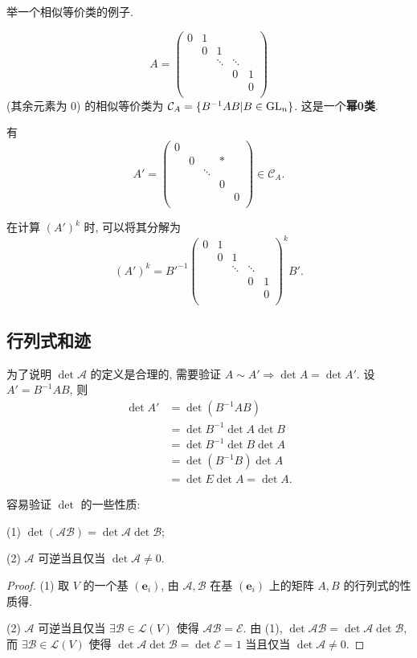 \documentclass{ctexart}
\begin{document}
举一个相似等价类的例子.
\begin{example}
    \[A=\begin{pmatrix}
        0 & 1 \\
        & 0 & 1 \\
        && \ddots & \ddots \\
        &&& 0 & 1 \\
        &&&& 0 \\
    \end{pmatrix}\]
    (其余元素为 $0$) 的相似等价类为 $\mathcal{C}_A=\{B^{-1}AB|B\in\operatorname{GL} _n\}$. 这是一个\textbf{幂0类}.

    有
    \[A'=\begin{pmatrix}
        0 \\
        & 0 && * \\
        && \ddots \\
        &&& 0 \\
        &&&& 0 \\
    \end{pmatrix}\in\mathcal{C}_A.\]

    在计算 $(A')^k$ 时, 可以将其分解为
    \[(A')^k=B'^{-1}\begin{pmatrix}
        0 & 1 \\
        & 0 & 1 \\
        && \ddots & \ddots \\
        &&& 0 & 1 \\
        &&&& 0 \\
    \end{pmatrix}^kB'.\]
\end{example}
\subsection{行列式和迹}
为了说明 $\det\mathcal{A}$ 的定义是合理的, 需要验证 $A\sim A'\Rightarrow\det A=\det A'$. 设 $A'=B^{-1}AB$, 则
\begin{align*}
    \det A' & =\det(B^{-1}AB) \\
    & =\det B^{-1}\det A\det B \\
    & =\det B^{-1}\det B\det A \\
    & =\det(B^{-1}B)\det A \\
    & =\det E\det A=\det A.
\end{align*}

容易验证 $\det$ 的一些性质:
\begin{property}
    (1) $\det(\mathcal{AB})=\det\mathcal{A}\det\mathcal{B}$;

    (2) $\mathcal{A}$ 可逆当且仅当 $\det\mathcal{A}\neq0$.
\end{property}
\begin{proof}
    (1) 取 $V$ 的一个基 $(\boldsymbol{e}_i)$, 由 $\mathcal{A},\mathcal{B}$ 在基 $(\boldsymbol{e}_i)$ 上的矩阵 $A,B$ 的行列式的性质得.

    (2) $\mathcal{A}$ 可逆当且仅当 $\exists\mathcal{B}\in\mathcal{L}(V)$ 使得 $\mathcal{AB}=\mathcal{E}$. 由 (1), $\det\mathcal{AB}=\det\mathcal{A}\det\mathcal{B}$, 而 $\exists\mathcal{B}\in\mathcal{L}(V)$ 使得 $\det\mathcal{A}\det\mathcal{B}=\det\mathcal{E}=1$ 当且仅当 $\det\mathcal{A}\neq0$.
\end{proof}
\end{document}
